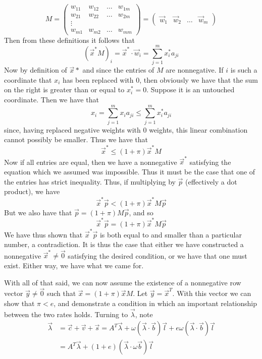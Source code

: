 \[ M = \begin{pmatrix} w_{11} & w_{12} & \ldots & w_{1m} \\
		w_{21} & w_{22} & \ldots & w_{2m} \\
		\vdots \\ w_{m1} & w_{m2} & \ldots & w_{mm} \end{pmatrix} = \begin{pmatrix} \vec{w}_1 & \vec{w}_2 & \ldots & \vec{w}_m \end{pmatrix} \]
Then from these definitions it follows that 
\[ (\vec{x}^*M)_i = \vec{x}^* \cdot \vec{w}_i = \sum_{j=1}^m x^*_ia_{ji} \]
Now by definition of $\vec{x}*$ and since the entries of $M$ are nonnegative. If $i$ is such a coordinate that $x_i$ has been replaced with $0$, then obviously we have that the sum on the right is greater than or equal to $x^*_i = 0$. Suppose it is an untouched coordinate. Then we have that
\[ x_i = \sum_{j=1}^m x_ia_{ji} \leq \sum_{j=1}^m x_i^*a_{ji} \]
since, having replaced negative weights with $0$ weights, this linear combination cannot possibly be smaller. Thus we have that
\[ \vec{x}^* \leq (1+\pi)\vec{x}^*M \]
Now if all entries are equal, then we have a nonnegative $\vec{x}^*$ satisfying the equation which we assumed was impossible. Thus it must be the case that one of the entries has strict inequality. Thus, if multiplying by $\vec{p}$ (effectively a dot product), we have
\[ \vec{x}^*\vec{p} < (1+\pi)\vec{x}^*M \vec{p} \]
But we also have that $\vec{p} = (1+\pi)M\vec{p}$, and so 
\[ \vec{x}^*\vec{p} = (1+\pi)\vec{x}^*M\vec{p} \]
We have thus shown that $\vec{x}^*\vec{p}$ is both equal to and smaller than a particular number, a contradiction. It is thus the case that either we have constructed a nonnegative $\vec{x}^* \neq \vec{0}$ satisfying the desired condition, or we have that one must exist. Either way, we have what we came for. \par 
With all of that said, we can now assume the existence of a nonnegative row vector $\vec{y} \neq\vec{0}$ such that $\vec{x} = (1+\pi)\vec{x}M$. Let $\vec{y} = \vec{x}^T$. With this vector we can show that $\pi < e$, and demonstrate a condition in which an important relationship between the two rates holds. Turning to $\vec{\lambda}$, note
\begin{align*}
	\vec{\lambda} &= \vec{c} + \vec{v} + \vec{s} = A^T\vec{\lambda} + \omega(\vec{\lambda}\cdot\vec{b})\vec{l} + e\omega(\vec{\lambda}\cdot\vec{b})\vec{l} \\
	&= A^T\vec{\lambda} + (1+e)(\vec{\lambda}\cdot \omega \vec{b})\vec{l} \\
\end{align*} 
